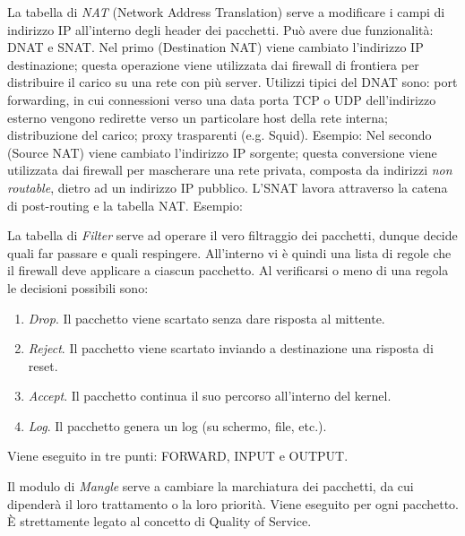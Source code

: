 La tabella di \textit{NAT} (Network Address Translation) serve a modificare i campi di indirizzo IP all'interno degli header dei pacchetti. Può avere due funzionalità: DNAT e SNAT. Nel primo (Destination NAT) viene cambiato l'indirizzo IP destinazione; questa operazione viene utilizzata dai firewall di frontiera per distribuire il carico su una rete con più server. Utilizzi tipici del DNAT sono: port forwarding, in cui connessioni verso una data porta TCP o UDP dell'indirizzo esterno vengono redirette verso un particolare host della rete interna; distribuzione del carico; proxy trasparenti (e.g. Squid). Esempio:
Nel secondo (Source NAT) viene cambiato l'indirizzo IP sorgente; questa conversione viene utilizzata dai firewall per mascherare una rete privata, composta da indirizzi \textit{non routable}, dietro ad un indirizzo IP pubblico. L'SNAT lavora attraverso la catena di post-routing e la tabella NAT. Esempio:

La tabella di \textit{Filter} serve ad operare il vero filtraggio dei pacchetti, dunque decide quali far passare e quali respingere. All'interno vi è quindi una lista di regole che il firewall deve applicare a ciascun pacchetto. Al verificarsi o meno di una regola le decisioni possibili sono:
\begin{enumerate}
	\item \textit{Drop}. Il pacchetto viene scartato senza dare risposta al mittente.
	\item \textit{Reject}. Il pacchetto viene scartato inviando a destinazione una risposta di reset.
	\item \textit{Accept}. Il pacchetto continua il suo percorso all'interno del kernel.
	\item \textit{Log}. Il pacchetto genera un log (su schermo, file, etc.).
\end{enumerate}
Viene eseguito in tre punti: FORWARD, INPUT e OUTPUT.

Il modulo di \textit{Mangle} serve a cambiare la marchiatura dei pacchetti, da cui dipenderà il loro trattamento o la loro priorità. Viene eseguito per ogni pacchetto. È strettamente legato al concetto di Quality of Service.

